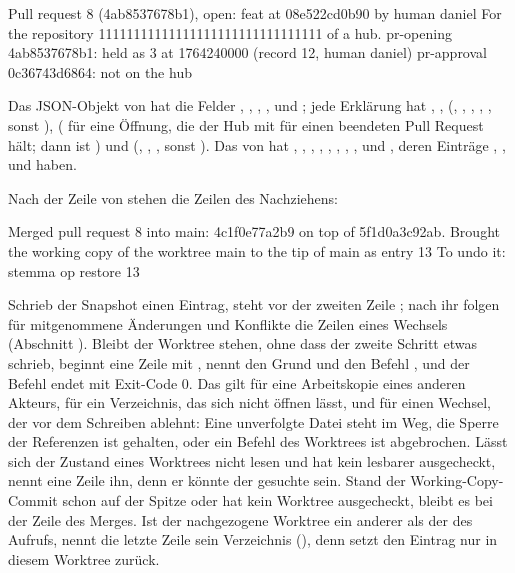 \starttyping
Pull request 8 (4ab8537678b1), open: feat at 08e522cd0b90 by human daniel
For the repository 11111111111111111111111111111111 of a hub.
  pr-opening 4ab8537678b1: held as 3 at 1764240000 (record 12, human daniel)
  pr-approval 0c36743d6864: not on the hub
\stoptyping

Das JSON-Objekt von  hat die Felder , , ,
,  und ; jede Erklärung hat ,
,  (, , , ,
, sonst ),  ( für eine Öffnung, die der Hub
mit  für einen beendeten Pull Request hält; dann ist 
) und  (, , , sonst
). Das von  hat , ,
, , , , , ,
 und , deren Einträge , ,
 und  haben.

Nach der Zeile von  stehen die Zeilen des Nachziehens:

\starttyping
Merged pull request 8 into main: 4c1f0e77a2b9 on top of 5f1d0a3c92ab.
Brought the working copy of the worktree main to the tip of main as entry 13
To undo it: stemma op restore 13
\stoptyping

Schrieb der Snapshot einen Eintrag, steht vor der zweiten Zeile
;
nach ihr folgen für mitgenommene Änderungen und Konflikte die Zeilen eines Wechsels
(Abschnitt ).
Bleibt der Worktree stehen, ohne dass der zweite Schritt etwas schrieb, beginnt eine Zeile mit
,
nennt den Grund und den Befehl , und der Befehl endet mit Exit-Code 0.
Das gilt für eine Arbeitskopie eines anderen Akteurs, für ein Verzeichnis, das sich nicht
öffnen lässt, und für einen Wechsel, der vor dem Schreiben ablehnt: Eine unverfolgte Datei steht
im Weg, die Sperre der Referenzen ist gehalten, oder ein Befehl des Worktrees ist abgebrochen.
Lässt sich der Zustand eines Worktrees nicht lesen und hat kein lesbarer 
ausgecheckt, nennt eine Zeile ihn, denn er könnte der gesuchte sein.
Stand der Working-Copy-Commit schon auf der Spitze oder hat kein Worktree 
ausgecheckt, bleibt es bei der Zeile des Merges.
Ist der nachgezogene Worktree ein anderer als der des Aufrufs, nennt die letzte Zeile sein
Verzeichnis (),
denn  setzt den Eintrag nur in diesem Worktree zurück.

